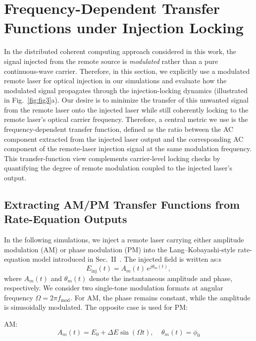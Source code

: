 \documentclass[%
 aip,
 apl,
 amsmath,amssymb,
 reprint,%
 floatfix,
]{revtex4-1}
\begin{document}

\section{Frequency-Dependent Transfer Functions under Injection Locking}
In the distributed coherent computing approach considered in this work, the signal injected from the remote source is \emph{modulated} rather than a pure continuous-wave carrier. Therefore, in this section, we explicitly use a modulated remote laser for optical injection in our simulations and evaluate how the modulated signal propagates through the injection-locking dynamics (illustrated in Fig.~\ref{fig:fig3}a). Our desire is to minimize the transfer of this unwanted signal from the remote laser onto the injected laser while still coherently locking to the remote laser's optical carrier frequency. Therefore, a central metric we use is the frequency-dependent transfer function, defined as the ratio between the AC component extracted from the injected laser output and the corresponding AC component of the remote-laser injection signal at the same modulation frequency. This transfer-function view complements carrier-level locking checks by quantifying the degree of remote modulation coupled to the injected laser's output.

\subsection{Extracting AM/PM Transfer Functions from Rate-Equation Outputs}

In the following simulations, we inject a remote laser carrying either amplitude modulation (AM) or phase modulation (PM) into the Lang--Kobayashi-style rate-equation model introduced in Sec.~II~\cite{Fragkos2012JLT_AmpLimiter_OIL}. The injected field is written as:s
\begin{equation}
E_{\mathrm{inj}}(t) = A_m(t)\,e^{j\theta_m(t)},
\end{equation}
where $A_m(t)$ and $\theta_m(t)$ denote the instantaneous amplitude and phase, respectively. We consider two single-tone modulation formats at angular frequency $\Omega = 2\pi f_{\mathrm{mod}}$. For AM, the phase remains constant, while the amplitude is sinusoidally modulated. The opposite case is used for PM:

AM:
\begin{equation}
A_m(t) = E_{0} + \Delta E \sin(\Omega t), \ \ \ \ \
\theta_m(t)=\phi_0
\end{equation}
\end{document}
